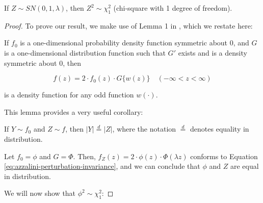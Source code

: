 \begin{property} \label{prop:2}
  If $Z \sim SN(0, 1, \lambda)$, then $Z^2 \sim \chi^2_1$ (chi-square with 1 degree of freedom).
\end{property}

\begin{proof}
  To prove our result, we make use of Lemma 1 in \citet{azzalini}, which we
  restate here:

  \begin{helper-lem}
    If $f_0$ is a one-dimensional probability density function symmetric about
    0, and $G$ is a one-dimensional distribution function such that $G'$ exists
    and is a density symmetric about 0, then

    \begin{equation}
      \label{eq:azzalini-perturbation-invariance}
      f(z) = 2 \cdot f_0(z) \cdot G\{w(z)\} \quad (-\infty < z < \infty)
    \end{equation}

    is a density function for any odd function $w(\cdot)$.
  \end{helper-lem}

  This lemma provides a very useful corollary:

  \begin{helper-cor}
    If $Y \sim f_0$ and $Z \sim f$, then $|Y| \overset{d}{=} |Z|$, where the
    notation $\overset{d}{=}$ denotes equality in distribution.    
  \end{helper-cor}

  Let $f_0 = \phi$ and $G = \Phi$. Then, $f_Z(z) = 2 \cdot \phi(z) \cdot
  \Phi(\lambda z)$ conforms to Equation
  \eqref{eq:azzalini-perturbation-invariance}, and we can conclude that $\phi$
  and $Z$ are equal in distribution.

  We will now show that $\phi^2 \sim \chi^2_1$:


\end{proof}
